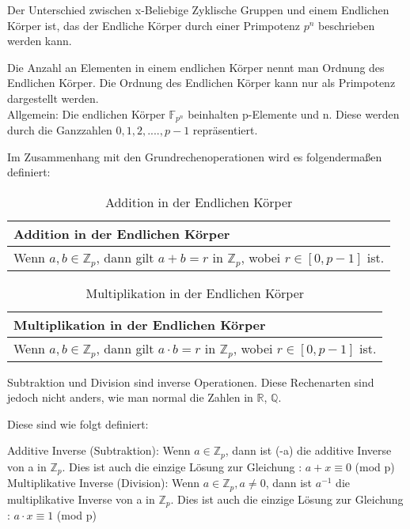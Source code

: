 Der Unterschied zwischen x-Beliebige Zyklische Gruppen und einem Endlichen Körper ist, das der Endliche Körper durch einer Primpotenz $ p^n $ beschrieben werden kann.

Die Anzahl an Elementen in einem endlichen Körper nennt man Ordnung des Endlichen Körper. Die Ordnung des Endlichen Körper kann nur als Primpotenz dargestellt werden.\\

Allgemein: Die endlichen Körper $\mathbb{F}_{p^n}$ beinhalten p-Elemente und n. Diese werden durch die Ganzzahlen ${0,1,2,....,p-1}$ repräsentiert. 

Im Zusammenhang mit den Grundrechenoperationen wird es folgendermaßen definiert:
\begin{table}[!ht]
    \centering
        \begin{tabular}{l}
            \toprule
            \textbf{Addition in der Endlichen Körper}\\
            \midrule
            Wenn $ a, b \in \mathbb{Z}_p $, dann gilt $ a+b =r$ in $ \mathbb{Z}_p $, wobei $r \in [0, p-1]$ ist.\\
           \bottomrule
        \end{tabular}
        \caption{Addition in der Endlichen Körper}
        \label{tab3}
    \end{table}

    \begin{table}[!ht]
        \centering
            \begin{tabular}{l}
                \toprule
                \textbf{Multiplikation in der Endlichen Körper}\\
                \midrule
                Wenn $ a, b \in \mathbb{Z}_p $, dann gilt $ a \cdot b =r$ in $ \mathbb{Z}_p $, wobei $r \in [0, p-1]$ ist.\\
               \bottomrule
            \end{tabular}
            \caption{Multiplikation in der Endlichen Körper}
            \label{tab3}
        \end{table}

Subtraktion und Division sind inverse Operationen. Diese Rechenarten sind jedoch nicht anders, wie man normal die Zahlen in $\mathbb{R}$, $\mathbb{Q}$.

Diese sind wie folgt definiert:

Additive Inverse (Subtraktion): Wenn $a \in \mathbb{Z}_p$, dann ist (-a) die additive Inverse von a in $\mathbb{Z}_p$. Dies ist auch die einzige Lösung zur Gleichung : $a + x \equiv 0$ (mod p)
Multiplikative Inverse (Division): Wenn $a \in \mathbb{Z}_p, a \neq 0 $,  dann ist $a^{-1}$ die multiplikative Inverse von a in $\mathbb{Z}_p$. Dies ist auch die einzige Lösung zur Gleichung : $a \cdot x \equiv 1$ (mod p)

